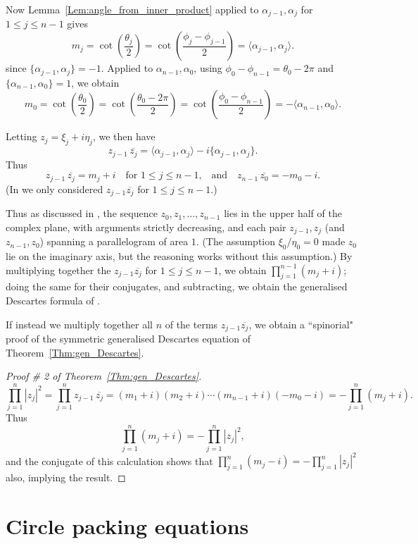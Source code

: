 \documentclass[12pt]{amsart}
\numberwithin{equation}{section}
\theoremstyle{named}
\newcommand{\reflem}[1]{Lemma~\ref{Lem:#1}}
\newcommand{\refthm}[1]{Theorem~\ref{Thm:#1}}
\begin{document}
Now \reflem{angle_from_inner_product} applied to $\alpha_{j-1}, \alpha_j$ for $1 \leq j \leq n-1$ gives
\[
m_j
= \cot \left( \frac{\theta_j}{2} \right) 
= \cot \left( \frac{\phi_j - \phi_{j-1}}{2} \right)
= \langle \alpha_{j-1}, \alpha_j \rangle.
\]
since $\{\alpha_{j-1}, \alpha_j\} = -1$. Applied to $\alpha_{n-1}, \alpha_0$, using $\phi_0 - \phi_{n-1} = \theta_0 - 2\pi$ and $\{\alpha_{n-1}, \alpha_0\} = 1$, we obtain
\[
m_0
= \cot \left( \frac{\theta_0}{2} \right)
= \cot \left( \frac{\theta_0 - 2\pi}{2} \right) = \cot \left( \frac{\phi_0 - \phi_{n-1}}{2} \right)
= - \langle \alpha_{n-1}, \alpha_0 \rangle.
\]

Letting $z_j = \xi_j + i \eta_j$, we then have
\[
z_{j-1} \, \overline{z_j}
= \langle \alpha_{j-1}, \alpha_j \rangle - i \{ \alpha_{j-1}, \alpha_j \}.
\]
Thus
\[
z_{j-1} \, \overline{z_j}
= m_j + i \quad \text{for $1 \leq j \leq n-1$,}
\quad \text{and} \quad
z_{n-1} \, \overline{z_0}
= - m_0 - i.
\]
(In \cite{MZ25} we only considered $z_{j-1} \overline{z_j}$ for $1 \leq j \leq n-1$.)

Thus as discussed in \cite[section 5]{MZ25}, the sequence $z_0, z_1, \ldots, z_{n-1}$ lies in the upper half of the complex plane, with arguments strictly decreasing, and each pair $z_{j-1}, z_j$ (and $z_{n-1}, z_0$) spanning a parallelogram of area $1$. (The assumption $\xi_0/\eta_0 = 0$ made $z_0$ lie on the imaginary axis, but the reasoning works without this assumption.) By multiplying together the $z_{j-1} \overline{z_j}$ for $1 \leq j \leq n-1$, we obtain $\prod_{j=1}^{n-1} (m_j + i)$; doing the same for their conjugates, and subtracting, we obtain the generalised Descartes formula of \cite{MZ25}.

If instead we multiply together all $n$ of the terms $z_{j-1} \overline{z_j}$, we obtain a ``spinorial" proof of the symmetric generalised Descartes equation of \refthm{gen_Descartes}.

\begin{proof}[Proof \# 2 of \refthm{gen_Descartes}]
\[
\prod_{j=1}^n |z_j|^2 = \prod_{j=1}^{n} z_{j-1} \, \overline{z_j}
= (m_1 + i)(m_2 + i) \cdots (m_{n-1} + i)(-m_0 -i)
= - \prod_{j=1}^n \left( m_j + i \right).
\]
Thus
\[
\prod_{j=1}^n \left( m_j + i \right) = - \prod_{j=1}^n |z_j|^2,
\]
and the conjugate of this calculation shows that $\prod_{j=1}^n \left( m_j - i \right) = - \prod_{j=1}^n |z_j|^2$ also, 
implying the result.
\end{proof}


\section{Circle packing equations}
\label{Sec:circle_packings_solve_equations}
\end{document}
